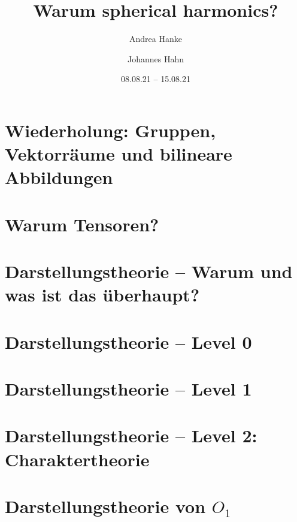 \documentclass[fontsize=11pt,fleqn,a4paper]{scrartcl}
\author{Andrea Hanke \and Johannes Hahn}
\title{Warum spherical harmonics?}
\date{08.08.21 -- 15.08.21}
\begin{document}
\maketitle

\tableofcontents
\pagebreak
\setcounter{section}{-1}
\section{Wiederholung: Gruppen, Vektorräume und bilineare Abbildungen}



\pagebreak

\section{Warum Tensoren?}



\pagebreak
\section{Darstellungstheorie -- Warum und was ist das überhaupt?}




\pagebreak
\section{Darstellungstheorie -- Level 0}




\pagebreak
\section{Darstellungstheorie -- Level 1}




\pagebreak
\section{Darstellungstheorie -- Level 2: Charaktertheorie}



\pagebreak
\section{Darstellungstheorie \texorpdfstring{von $O_1$}{der Isometriegruppe der reellen Geraden}}

\end{document}
